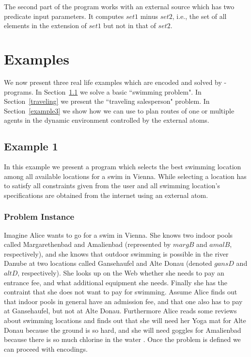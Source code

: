 \documentclass[a4paper, titlepage]{article}
\begin{document}
The second part of the program works with an external source 
which has two predicate input parameters. It computes $\mathit{set1}$ minus $\mathit{set2}$, i.e., the set of all elements in the extension of $\mathit{set1}$ but not in that of $\mathit{set2}$. 

\section{Examples}
\label{sec:examples}
We now present three real life examples  
which are encoded and solved by \hex-programs. In Section~\ref{example1} we solve a basic ``swimming 
problem". In Section~\ref{traveling} we present the ``traveling salesperson" problem. In Section~\ref{example3} we show how we can use \dlvhex{} to plan routes of one or multiple agents in the dynamic 
environment controlled by the external atoms.

\subsection{Example 1}
\label{example1}
In this example we present a program which selects  
the best swimming location among all available locations 
for a swim in Vienna. While selecting a location has to 
satisfy all constraints given from the user and all swimming location's specifications are obtained from the internet using  
an external atom.
 
\subsubsection{Problem Instance}
Imagine Alice wants to go for a swim in Vienna. She knows 
two indoor pools called Margarethenbad and Amalienbad 
(represented by $\mathit{margB}$ and $\mathit{amalB}$, 
respectively), and she knows that outdoor swimming is 
possible in the river Danube at two locations called 
Gansehaufel and Alte Donau (denoted $\mathit{gansD}$ and 
$\mathit{altD}$, respectively). She looks up on the Web 
whether she needs to pay an entrance fee, and what 
additional equipment she needs. Finally she has the 
contraint that she does not want to pay for swimming. 
Assume Alice finds out that indoor pools in general have an 
admission fee, and that one also
has to pay at Gansehaufel, but not at Alte Donau. 
Furthermore Alice reads some reviews about swimming 
locations and finds out that she will need her Yoga mat for 
Alte Donau because the ground is so hard, and she will need 
goggles for Amalienbad because there is so much chlorine in 
the water \cite{efikrs2015}. Once the problem is defined we can 
proceed with encodings.    
\end{document}
